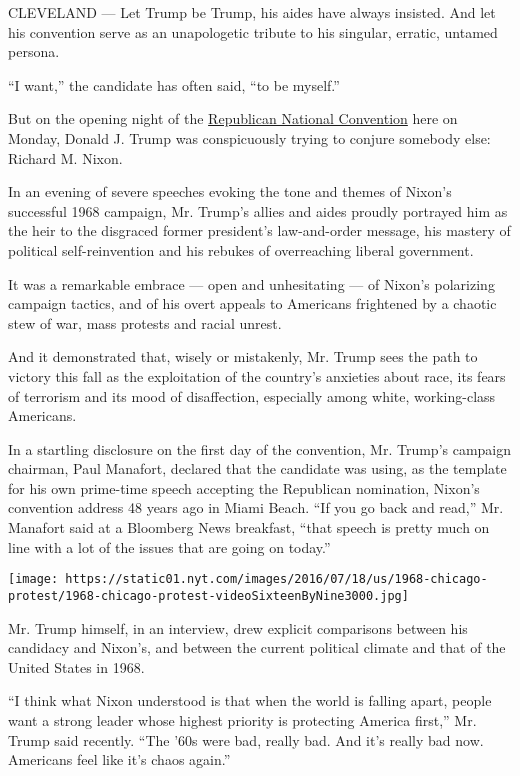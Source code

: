 CLEVELAND --- Let Trump be Trump, his aides have always insisted. And
let his convention serve as an unapologetic tribute to his singular,
erratic, untamed persona.

``I want,'' the candidate has often said, ``to be myself.''

But on the opening night of the
\href{http://www.nytimes.com/2016/07/20/us/politics/republican-national-convention.html}{Republican
National Convention} here on Monday, Donald J. Trump was conspicuously
trying to conjure somebody else: Richard M. Nixon.

In an evening of severe speeches evoking the tone and themes of Nixon's
successful 1968 campaign, Mr. Trump's allies and aides proudly portrayed
him as the heir to the disgraced former president's law-and-order
message, his mastery of political self-reinvention and his rebukes of
overreaching liberal government.

It was a remarkable embrace --- open and unhesitating --- of Nixon's
polarizing campaign tactics, and of his overt appeals to Americans
frightened by a chaotic stew of war, mass protests and racial unrest.

And it demonstrated that, wisely or mistakenly, Mr. Trump sees the path
to victory this fall as the exploitation of the country's anxieties
about race, its fears of terrorism and its mood of disaffection,
especially among white, working-class Americans.

In a startling disclosure on the first day of the convention, Mr.
Trump's campaign chairman, Paul Manafort, declared that the candidate
was using, as the template for his own prime-time speech accepting the
Republican nomination, Nixon's convention address 48 years ago in Miami
Beach. ``If you go back and read,'' Mr. Manafort said at a Bloomberg
News breakfast, ``that speech is pretty much on line with a lot of the
issues that are going on today.''

\texttt{[image: https://static01.nyt.com/images/2016/07/18/us/1968-chicago-protest/1968-chicago-protest-videoSixteenByNine3000.jpg]}

Mr. Trump himself, in an interview, drew explicit comparisons between
his candidacy and Nixon's, and between the current political climate and
that of the United States in 1968.

``I think what Nixon understood is that when the world is falling apart,
people want a strong leader whose highest priority is protecting America
first,'' Mr. Trump said recently. ``The '60s were bad, really bad. And
it's really bad now. Americans feel like it's chaos again.''


